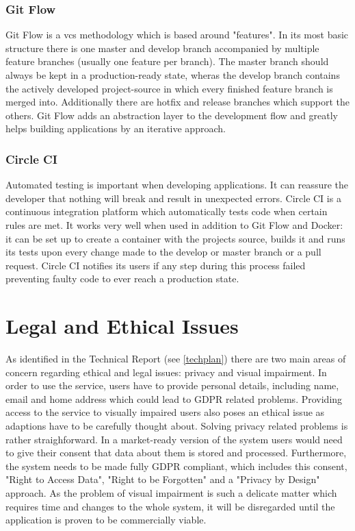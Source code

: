\subsubsection{Git Flow}
Git Flow is a \acrshort{vcs} methodology which is based around "features". In its most basic structure there is one master and develop branch accompanied by multiple feature branches (usually one feature per branch). The master branch should always be kept in a production-ready state, wheras the develop branch contains the actively developed project-source in which every finished feature branch is merged into. Additionally there are hotfix and release branches which support the others. Git Flow adds an abstraction layer to the development flow and greatly helps building applications by an iterative approach.

\subsubsection{Circle CI}
Automated testing is important when developing applications. It can reassure the developer that nothing will break and result in unexpected errors. Circle CI is a continuous integration platform which automatically tests code when certain rules are met. It works very well when used in addition to Git Flow and Docker: it can be set up to create a container with the projects source, builds it and runs its tests upon every change made to the develop or master branch or a pull request. Circle CI notifies its users if any step during this process failed preventing faulty code to ever reach a production state.

\section{Legal and Ethical Issues}
As identified in the Technical Report (see \autoref{techplan}) there are two main areas of concern regarding ethical and legal issues: privacy and visual impairment. In order to use the service, users have to provide personal details, including name, email and home address which could lead to GDPR related problems. Providing access to the service to visually impaired users also poses an ethical issue as adaptions have to be carefully thought about. Solving privacy related problems is rather straighforward. In a market-ready version of the system users would need to give their consent that data about them is stored and processed. Furthermore, the system needs to be made fully GDPR compliant, which includes this consent, "Right to Access Data", "Right to be Forgotten" and a "Privacy by Design" approach. As the problem of visual impairment is such a delicate matter which requires time and changes to the whole system, it will be disregarded until the application is proven to be commercially viable.  